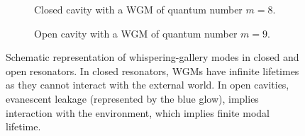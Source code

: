 \begin{figure}
  \centering
  \begin{subfigure}[b]{0.45\textwidth}
    \begin{center}
    \end{center}
  \caption{Closed cavity with a WGM of quantum number $m=8$.}
  \end{subfigure}
  \begin{subfigure}[b]{0.45\textwidth}
    \begin{center}
    \end{center}
  \caption{Open cavity with a WGM of quantum number $m=9$.}
  \end{subfigure}

\caption[Schematic representation of whispering-gallery modes]
	{Schematic representation of whispering-gallery modes in closed
	and open resonators. In closed resonators, WGMs have infinite lifetimes
	as they cannot interact with the external world. In open cavities, evanescent
	leakage (represented by the blue glow), implies interaction with the environment, which
	implies finite modal lifetime.}
\label{fig:intro.whisperingGalleryWaves}
\end{figure}

